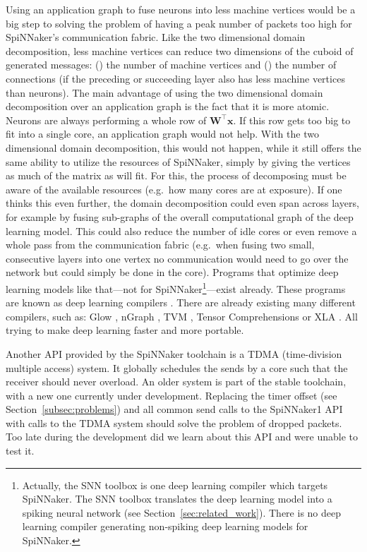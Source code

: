 \documentclass[]{article}
\begin{document}
Using an application graph to fuse neurons into less machine vertices
would be a big step to solving the problem of having a peak number of
packets too high for SpiNNaker's communication fabric.
Like the two dimensional domain decomposition, less machine vertices
can reduce two dimensions of the cuboid of generated messages:
() the number of machine vertices and ()
the number of connections (if the preceding or succeeding layer also
has less machine vertices than neurons).
The main advantage of using the two dimensional domain decomposition
over an application graph is the fact that it is more atomic.
Neurons are always performing a whole row of
$\mathbf{W}^\top\mathbf{x}$.
If this row gets too big to fit into a single core, an application
graph would not help.
With the two dimensional domain decomposition, this would not happen,
while it still offers the same ability to utilize the resources of
SpiNNaker, simply by giving the vertices as much of the matrix as will
fit.
For this, the process of decomposing must be aware of the available
resources (e.g.\ how many cores are at exposure).
If one thinks this even further, the domain decomposition could even
span across layers, for example by fusing sub-graphs of the
overall computational graph of the deep learning model.
This could also reduce the number of idle cores or even remove
a whole pass from the communication fabric (e.g.\ when fusing two
small, consecutive layers into one vertex no communication would need
to go over the network but could simply be done in the core).
Programs that optimize deep learning models like that---not for
SpiNNaker\footnote{Actually, the SNN toolbox is one deep learning
  compiler which targets SpiNNaker.
  The SNN toolbox translates the deep learning model into a spiking
  neural network (see Section~\ref{sec:related_work}).
  There is no deep learning compiler generating non-spiking deep
  learning models for SpiNNaker.}---exist already.
These programs are known as deep learning compilers
\citep{li_et_al_2020}.
There are already existing many different compilers, such as:
Glow \citep{rotem_et_al_2018}, nGraph \citep{cyphers_et_al_2018},
TVM \citep{chen_et_al_2018}, Tensor Comprehensions
\citep{vasilache_et_al_2018} or XLA \citep{leary_et_al_2017}.
All trying to make deep learning faster and more portable.

Another API provided by the SpiNNaker toolchain is a TDMA
(time-division multiple access) system.
It globally schedules the sends by a core such that the receiver
should never overload.
An older system is part of the stable toolchain, with a new one
currently under development.
Replacing the timer offset (see Section~\ref{subsec:problems}) and all
common send calls to the SpiNNaker1 API with calls to the TDMA system
should solve the problem of dropped packets.
Too late during the development did we learn about this API and were
unable to test it.
\end{document}
